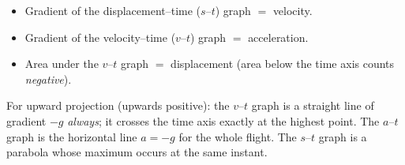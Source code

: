 \documentclass[11pt]{article}
\newcommand{\cle}[1]{{\popxbold\color{popdark}#1}}
\begin{document}
\begin{aretenir}
\begin{itemize}
\item \cle{Gradient} of the displacement--time ($s$--$t$) graph $=$ \cle{velocity}.
\item \cle{Gradient} of the velocity--time ($v$--$t$) graph $=$ \cle{acceleration}.
\item \cle{Area} under the $v$--$t$ graph $=$ \cle{displacement} (area below the time axis counts \emph{negative}).
\end{itemize}
For upward projection (upwards positive): the $v$--$t$ graph is a straight line of gradient $-g$ \emph{always}; it crosses the time axis exactly at the highest point. The $a$--$t$ graph is the horizontal line $a = -g$ for the whole flight. The $s$--$t$ graph is a parabola whose maximum occurs at the same instant.
\end{aretenir}
\end{document}
